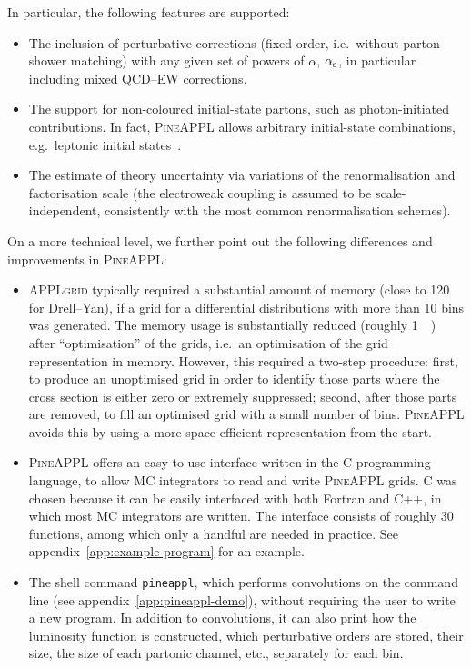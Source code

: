 In particular, the following features are supported:
\begin{itemize}
\item The inclusion of perturbative corrections (fixed-order, i.e.\ without parton-shower matching) with any given set of powers of $\alpha$, $\alpha_\mathrm{s}$, in particular including mixed QCD--EW corrections.
\item The support for non-coloured initial-state partons, such as photon-initiated contributions.
In fact, \textsc{PineAPPL} allows arbitrary initial-state combinations, e.g.\ leptonic initial states~\cite{Bertone:2015lqa,Buonocore:2020nai}.
\item The estimate of theory uncertainty via variations of the renormalisation and factorisation scale (the electroweak coupling is assumed to be scale-independent, consistently with the most common renormalisation schemes).
\end{itemize}
On a more technical level, we further point out the following differences and improvements in \textsc{PineAPPL}:
\begin{itemize}
\item \textsc{APPLgrid} typically required a substantial amount of memory (close to \SI{120}{\giga\byte} for Drell--Yan), if a grid for a differential distributions with more than 10 bins was generated.
The memory usage is substantially reduced (roughly \SI{1}{\giga\byte}) after \enquote{optimisation} of the grids, i.e.\ an optimisation of the grid representation in memory.
However, this required a two-step procedure: first, to produce an unoptimised grid in order to identify those parts where the cross section is either zero or extremely suppressed; second, after those parts are removed, to fill an optimised grid with a small number of bins.
\textsc{PineAPPL} avoids this by using a more space-efficient representation from the start.
\item \textsc{PineAPPL} offers an easy-to-use interface written in the C programming language, to allow MC integrators to read and write \textsc{PineAPPL} grids.
C was chosen because it can be easily interfaced with both Fortran and C++, in which most MC integrators are written.
The interface consists of roughly 30 functions, among which only a handful are needed in practice.
See appendix~\ref{app:example-program} for an example.
\item The shell command \texttt{pineappl}, which performs convolutions on the command line (see appendix~\ref{app:pineappl-demo}), without requiring the user to write a new program.
In addition to convolutions, it can also print how the luminosity function is constructed, which perturbative orders are stored, their size, the size of each partonic channel, etc., separately for each bin.
\end{itemize}

